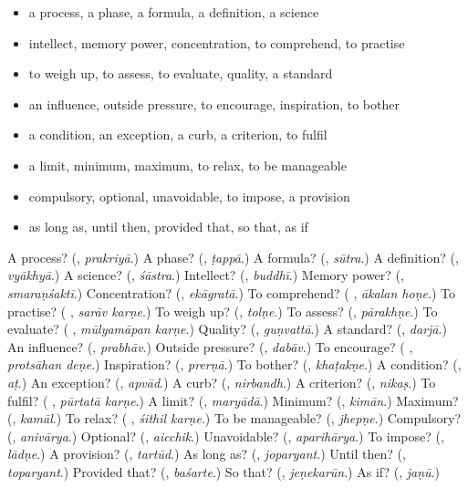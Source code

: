 \begin{itemize}
\raggedright
  \item a process, a phase, a formula, a definition, a science
  \item intellect, memory power, concentration, to comprehend, to practise
  \item to weigh up, to assess, to evaluate, quality, a standard
  \item an influence, outside pressure, to encourage, inspiration, to bother
  \item a condition, an exception, a curb, a criterion, to fulfil
  \item a limit, minimum, maximum, to relax, to be manageable
  \item compulsory, optional, unavoidable, to impose, a provision
  \item as long as, until then, provided that, so that, as if
\end{itemize}

\begin{tcolorbox}[breakable,colback=teal!4,colframe=teal!35!black,title={Before you move on}]
A process? (\textbf{}, \emph{prakriyā}.) A phase? (\textbf{}, \emph{ṭappā}.) A formula? (\textbf{}, \emph{sūtra}.) A definition? (\textbf{}, \emph{vyākhyā}.) A science? (\textbf{}, \emph{śāstra}.) Intellect? (\textbf{}, \emph{buddhī}.) Memory power? (\textbf{}, \emph{smaraṇśaktī}.) Concentration? (\textbf{}, \emph{ekāgratā}.) To comprehend? (\textbf{ }, \emph{ākalan hoṇe}.) To practise? (\textbf{ }, \emph{sarāv karṇe}.) To weigh up? (\textbf{}, \emph{tolṇe}.) To assess? (\textbf{}, \emph{pārakhṇe}.) To evaluate? (\textbf{ }, \emph{mūlyamāpan karṇe}.) Quality? (\textbf{}, \emph{guṇvattā}.) A standard? (\textbf{}, \emph{darjā}.) An influence? (\textbf{}, \emph{prabhāv}.) Outside pressure? (\textbf{}, \emph{dabāv}.) To encourage? (\textbf{ }, \emph{protsāhan deṇe}.) Inspiration? (\textbf{}, \emph{prerṇā}.) To bother? (\textbf{}, \emph{khaṭakṇe}.) A condition? (\textbf{}, \emph{aṭ}.) An exception? (\textbf{}, \emph{apvād}.) A curb? (\textbf{}, \emph{nirbandh}.) A criterion? (\textbf{}, \emph{nikaṣ}.) To fulfil? (\textbf{ }, \emph{pūrtatā karṇe}.) A limit? (\textbf{}, \emph{maryādā}.) Minimum? (\textbf{}, \emph{kimān}.) Maximum? (\textbf{}, \emph{kamāl}.) To relax? (\textbf{ }, \emph{śithil karṇe}.) To be manageable? (\textbf{}, \emph{jhepṇe}.) Compulsory? (\textbf{}, \emph{anivārya}.) Optional? (\textbf{}, \emph{aicchik}.) Unavoidable? (\textbf{}, \emph{aparihārya}.) To impose? (\textbf{}, \emph{lādṇe}.) A provision? (\textbf{}, \emph{tartūd}.) As long as? (\textbf{}, \emph{joparyant}.) Until then? (\textbf{}, \emph{toparyant}.) Provided that? (\textbf{}, \emph{baśarte}.) So that? (\textbf{}, \emph{jeṇekarūn}.) As if? (\textbf{}, \emph{jaṇū}.)
\end{tcolorbox}
